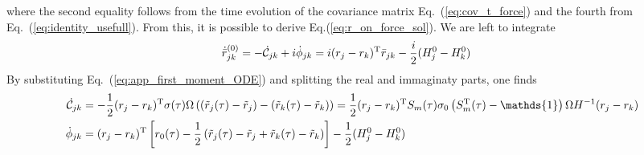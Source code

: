 \documentclass[%
reprint,
superscriptaddress,
nofootinbib,
 amsmath,amssymb,
prx,
floatfix,
]{revtex4-2}
\begin{document}
where the second equality follows from the time evolution of the covariance matrix Eq.~(\ref{eq:cov_t_force}) and the fourth from Eq.~(\ref{eq:identity_usefull}). From this, it is possible to derive Eq.(\ref{eq:r_on_force_sol}). We are left to integrate  
\begin{align*}
    \dot{\bar{r}}_{jk}^{(0)} &= - \dot{\mathcal{C}}_{jk}  + i \dot{\phi}_{jk} =    i  (r_j - r_k)^{\rm T}   \bar{r}_{jk}  - \frac{i}{2} (H_j^0-H_k^0) 
\end{align*}
By substituting Eq.~(\ref{eq:app_first_moment_ODE}) and splitting the real and immaginaty parts, one finds
\begin{align}
\label{eq:ode_C_appendix}
    \dot{\mathcal{C}}_{jk} &=  -  \frac{1}{2}  (r_j - r_k)^{\rm T}   \sigma (\tau)   \Omega  \left( (\tilde{r}_j (\tau) - \tilde{r}_j)  - (\tilde{r}_k (\tau) - \tilde{r}_k ) \right) =   \frac{1}{2}  (r_j - r_k)^{\rm T}  S_m(\tau) \sigma_0 \left(S_m^{\rm T}(\tau) - \mathds{1} \right)  \Omega  H^{-1} (r_j - r_k)  \\
    \label{eq:ode_phi_appendix}
    \dot{\phi}_{jk} &=  (r_j  - r_k )^{\rm T}\left[  r_0(\tau) - \frac{1}{2} \left( \tilde{r}_j(\tau) - \tilde{r}_j + \tilde{r}_k(\tau) - \tilde{r}_k \right)  \right] - \frac{1}{2} (H_j^0-H_k^0) 
\end{align}
\end{document}

